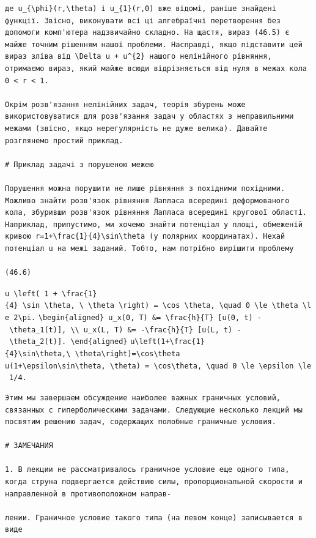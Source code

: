 \documentclass[
  ukrainian,
]{article}
\begin{document}
\begin{verbatim}
де u_{\phi}(r,\theta) і u_{1}(r,0) вже відомі, раніше знайдені функції. Звісно, виконувати всі ці алгебраїчні перетворення без допомоги комп'ютера надзвичайно складно. На щастя, вираз (46.5) є майже точним рішенням нашої проблеми. Насправді, якщо підставити цей вираз зліва від \Delta u + u^{2} нашого нелінійного рівняння, отримаємо вираз, який майже всюди відрізняється від нуля в межах кола 0 < r < 1.

Окрім розв'язання нелінійних задач, теорія збурень може використовуватися для розв'язання задач у областях з неправильними межами (звісно, якщо нерегулярність не дуже велика). Давайте розглянемо простий приклад.

# Приклад задачі з порушеною межею

Порушення можна порушити не лише рівняння з похідними похідними. Можливо знайти розв'язок рівняння Лапласа всередині деформованого кола, збуривши розв'язок рівняння Лапласа всередині кругової області. Наприклад, припустимо, ми хочемо знайти потенціал у площі, обмеженій кривою r=1+\frac{1}{4}\sin\theta (у полярних координатах). Нехай потенціал u на межі заданий. Тобто, нам потрібно вирішити проблему

(46.6)
\end{verbatim}

\texttt{u\ \textbackslash{}left(\ 1\ +\ \textbackslash{}frac\{1\}\{4\}\ \textbackslash{}sin\ \textbackslash{}theta,\ \textbackslash{}\ \textbackslash{}theta\ \textbackslash{}right)\ =\ \textbackslash{}cos\ \textbackslash{}theta,\ \textbackslash{}quad\ 0\ \textbackslash{}le\ \textbackslash{}theta\ \textbackslash{}le\ 2\textbackslash{}pi.}
\texttt{\textbackslash{}begin\{aligned\}\ u\_x(0,\ T)\ \&=\ \textbackslash{}frac\{h\}\{T\}\ {[}u(0,\ t)\ -\ \textbackslash{}theta\_1(t){]},\ \textbackslash{}\textbackslash{}\ u\_x(L,\ T)\ \&=\ -\textbackslash{}frac\{h\}\{T\}\ {[}u(L,\ t)\ -\ \textbackslash{}theta\_2(t){]}.\ \textbackslash{}end\{aligned\}}
\texttt{u\textbackslash{}left(1+\textbackslash{}frac\{1\}\{4\}\textbackslash{}sin\textbackslash{}theta,\textbackslash{}\ \textbackslash{}theta\textbackslash{}right)=\textbackslash{}cos\textbackslash{}theta}
\texttt{u(1+\textbackslash{}epsilon\textbackslash{}sin\textbackslash{}theta,\ \textbackslash{}theta)\ =\ \textbackslash{}cos\textbackslash{}theta,\ \textbackslash{}quad\ 0\ \textbackslash{}le\ \textbackslash{}epsilon\ \textbackslash{}le\ 1/4.}

\begin{verbatim}
Этим мы завершаем обсуждение наиболее важных граничных условий, связанных с гиперболическими задачами. Следующие несколько лекций мы посвятим решению задач, содержащих полобные граничные условия.

# ЗАМЕЧАНИЯ

1. В лекции не рассматривалось граничное условие еще одного типа, когда струна подвергается действию силы, пропорциональной скорости и направленной в противоположном направ-

лении. Граничное условие такого типа (на левом конце) записывается в виде
\end{verbatim}
\end{document}
